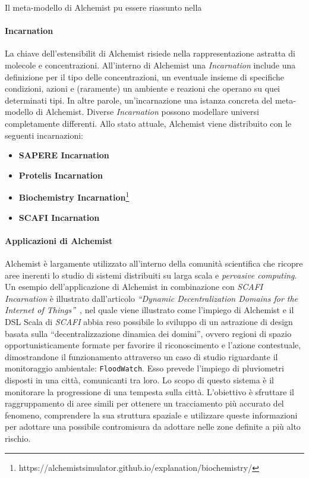 Il meta-modello di Alchemist pu essere riassunto nella 


\paragraph{Incarnation}\label{}
La chiave dell'estensibilit di Alchemist risiede nella rappresentazione astratta di molecole e concentrazioni.
All'interno di Alchemist una \textit{Incarnation} include una definizione per il tipo delle concentrazioni, un eventuale insieme di specifiche
condizioni, azioni e (raramente) un ambiente e reazioni che operano su quei determinati tipi. In altre parole, un'incarnazione  una
istanza concreta del meta-modello di Alchemist.
%
Diverse \textit{Incarnation} possono modellare universi completamente differenti. Allo stato attuale, Alchemist viene distribuito con le seguenti incarnazioni:
\begin{itemize}
    \item \textbf{SAPERE Incarnation}~\cite{sapere}
    \item \textbf{Protelis Incarnation}~\cite{protelis}
    \item \textbf{Biochemistry Incarnation}\footnote{https://alchemistsimulator.github.io/explanation/biochemistry/}
    \item \textbf{SCAFI Incarnation}~\cite{CASADEI2022101248}
\end{itemize}

\paragraph{Applicazioni di Alchemist}
Alchemist è largamente utilizzato all'interno della comunità scientifica che ricopre aree inerenti lo studio di sistemi distribuiti su larga scala e \textit{pervasive computing}.
Un esempio dell'applicazione di Alchemist in combinazione con \textit{SCAFI Incarnation} è illustrato dall'articolo \textit{``Dynamic Decentralization Domains for the Internet of Things''}~\cite{ddd-iot},
nel quale viene illustrato come l'impiego di Alchemist e il \ac{DSL} Scala di \textit{SCAFI} abbia reso possibile lo sviluppo di un astrazione di design
basata sulla ``decentralizzazione dinamica dei domini'', ovvero regioni di spazio opportunisticamente formate per favorire il riconoscimento e l'azione
contestuale, dimostrandone il funzionamento attraverso un caso di studio riguardante il monitoraggio ambientale: \texttt{FloodWatch}. Esso prevede
l'impiego di pluviometri disposti in una città, comunicanti tra loro. Lo scopo di questo sistema è il monitorare la progressione di una tempesta sulla città.
L'obiettivo è sfruttare il raggruppamento di aree simili per ottenere un tracciamento più accurato del fenomeno, comprendere la sua struttura spaziale e
utilizzare queste informazioni per adottare una possibile contromisura da adottare nelle zone definite a più alto rischio.

